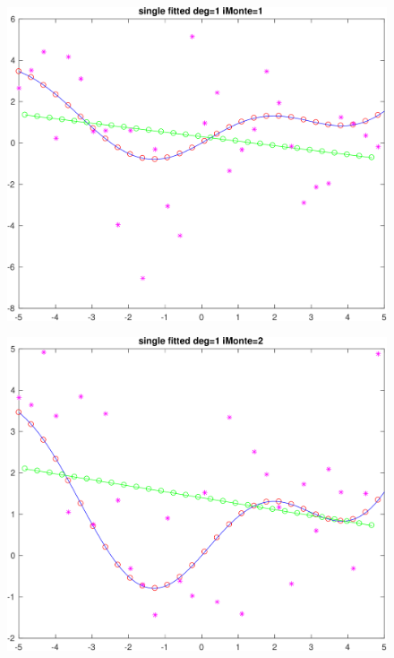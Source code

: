 \newpage


\begin{figure}[h!]
\centering\includegraphics[scale=0.1]{single_poly_d_1_iMonte_1.png}
\end{figure}

 \begin{figure}[h!]
\centering\includegraphics[scale=0.1]{single_poly_d_1_iMonte_2.png}
\end{figure}

